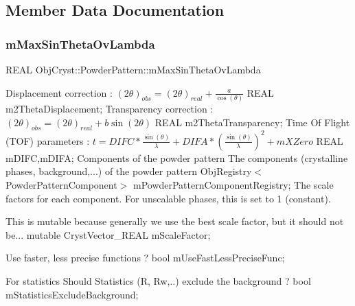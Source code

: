 \subsection{Member Data Documentation}
\mbox{\label{class_obj_cryst_1_1_powder_pattern_a5af69d404bd80c279935990a24edec0b}} 
\subsubsection{\texorpdfstring{mMaxSinThetaOvLambda}{mMaxSinThetaOvLambda}}
{\footnotesize\ttfamily R\+E\+AL Obj\+Cryst\+::\+Powder\+Pattern\+::m\+Max\+Sin\+Theta\+Ov\+Lambda\hspace{0.3cm}{\ttfamily [protected]}}

Displacement correction \+: $ (2\theta)_{obs} = (2\theta)_{real} + \frac{a}{\cos(\theta)} $ R\+E\+AL m2\+Theta\+Displacement; Transparency correction \+: $ (2\theta)_{obs} = (2\theta)_{real} + b\sin(2\theta) $ R\+E\+AL m2\+Theta\+Transparency; Time Of Flight (T\+OF) parameters \+: $ t = DIFC*\frac{\sin(\theta)}{\lambda} + DIFA*\left(\frac{\sin(\theta)}{\lambda}\right)^2 + mXZero$ R\+E\+AL m\+D\+I\+FC,m\+D\+I\+FA; Components of the powder pattern The components (crystalline phases, background,...) of the powder pattern Obj\+Registry$<$\+Powder\+Pattern\+Component$>$ m\+Powder\+Pattern\+Component\+Registry; The scale factors for each component. For unscalable phases, this is set to 1 (constant).

This is mutable because generally we use the \textquotesingle{}best\textquotesingle{} scale factor, but it should not be... mutable Cryst\+Vector\+\_\+\+R\+E\+AL m\+Scale\+Factor;

Use faster, less precise functions ? bool m\+Use\+Fast\+Less\+Precise\+Func;

For statistics Should Statistics (R, Rw,..) exclude the background ? bool m\+Statistics\+Exclude\+Background; \mbox{\label{class_obj_cryst_1_1_powder_pattern_aa38c508b5516a2b4e357b7116e0b11da}} 
